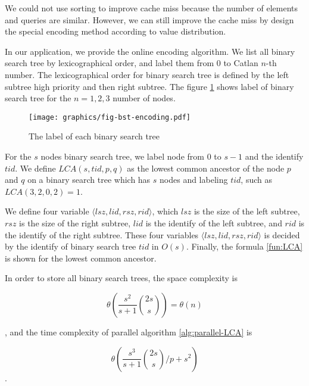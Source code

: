 We could not use sorting to improve cache miss because the number of
elements and queries are similar.  However, we can still improve the
cache miss by design the special encoding method according to value
distribution.

In our application, we provide the online encoding algorithm.  We list
all binary search tree by lexicographical order, and label them from
$0$ to Catlan $n$-th number.  The lexicographical order for binary
search tree is defined by the left subtree high priority and then
right subtree.  The figure \ref{fig:labelingBST} shows label of binary
search tree for the $n=1,2,3$ number of nodes.

\begin{figure}[!thb]
  \centering
  \texttt{[image: graphics/fig-bst-encoding.pdf]}
  \caption{The label of each binary search tree}
  \label{fig:labelingBST}
\end{figure}

For the $s$ nodes binary search tree, we label node from $0$ to $s-1$
and the identify $\mathit{tid}$.  We define $\mathit{LCA}(s,
\mathit{tid}, p, q)$ as the lowest common ancestor of the node $p$ and
$q$ on a binary search tree which has $s$ nodes and labeling
$\mathit{tid}$, such as $\mathit{LCA}(3, 2, 0, 2) = 1$.

We define four variable
$\langle\mathit{lsz},\mathit{lid},\mathit{rsz},\mathit{rid}\rangle$,
which $\mathit{lsz}$ is the size of the left subtree, $\mathit{rsz}$
is the size of the right subtree, $\mathit{lid}$ is the identify of
the left subtree, and $\mathit{rid}$ is the identify of the right
subtree.  These four variables
$\langle\mathit{lsz},\mathit{lid},\mathit{rsz},\mathit{rid}\rangle$ is
decided by the identify of binary search tree $\mathit{tid}$ in
$O(s)$.  Finally, the formula \ref{fun:LCA} is shown for the lowest
common ancestor.



In order to store all binary search trees, the space complexity is 

\begin{equation}
\theta\left(\frac{s^2}{s+1} \binom{2s}{s}\right) = \theta\left(n\right)
\end{equation}

, and the time complexity of parallel algorithm \ref{alg:parallel-LCA}
is

\begin{equation}
\theta\left(\frac{s^3}{s+1} \binom{2s}{s} \bigg/ p + s^2 \right)
\end{equation}.

